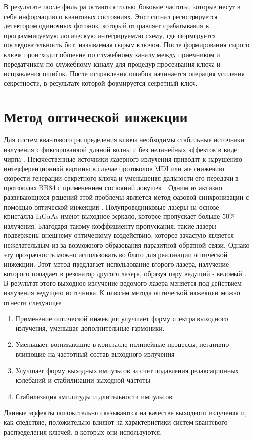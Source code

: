 В результате после фильтра остаются только боковые частоты, которые несут в себе информацию о квантовых состояниях. Этот сигнал регистрируется детектором одиночных фотонов, который отправляет срабатывания в программируемую логическую интегрируемую схему, где формируется последовательность бит, называемая сырым ключом. После формирования сырого ключа происходит общение по служебному каналу между приемником и передатчиком по служебному каналу для процедур просеивания ключа и исправления ошибок. После исправления ошибок начинается операция усиления секретности, в результате которой формируется секретный ключ.
\section{Метод оптической инжекции}\label{sec:ch2/sect1}
Для систем квантового распределения ключа необходимы стабильные источники излучения с фиксированной длиной волны и без нелинейных эффектов в виде чирпа \cite{yuan2016, roberts2018}. Некачественные источники лазерного излучения приводят к нарушению интерференционной  картины в случае протоколов MDI \cite{comandar2016} или же снижению скорости генерации секретного ключа и уменьшения дальности его передачи в протоколах BB84 с применением состояний ловушек \cite{xie2019}. Одним из активно развивающихся решений этой проблемы является метод фазовой синхронизации с помощью оптической инжекции \cite{liu2020}. 
\newline Полупроводниковые лазеры  на основе кристалла InGaAs имеют выходное зеркало, которое пропускает больше 50\% излучения. Благодаря такому коэффициенту пропускания, такие лазеры подвержены внешнему оптическому воздействию, которое зачастую является нежелательным из-за возможного образования паразитной обратной связи. Однако эту прозрачность можно использовать во благо для реализации оптической инжекции. Этот метод предлагает использование второго лазера, излучение которого попадает в резонатор другого лазера, образуя пару ведущий - ведомый \cite{shakhovoy2024}. В результат этого выходное излучение ведомого лазера меняется под действием излучения ведущего источника. К плюсам метода оптической инжекции можно отнести следующее
\begin{enumerate}
    \item Применение оптической инжекции улучшает форму спектра выходного излучения, уменьшая дополнительные гармоники.
    \item Уменьшает возникающие в кристалле нелинейные процессы, негативно влияющие на частотный состав выходного излучения
    \item Улучшает форму выходных импульсов за счет подавления релаксационных колебаний и стабилизации выходной частоты
    \item Стабилизация амплитуды и длительности импульсов
\end{enumerate}
Данные эффекты положительно сказываются на качестве выходного излучения и, как следствие, положительно влияют на характеристики систем квантового распределения ключей, в которых они используются.
